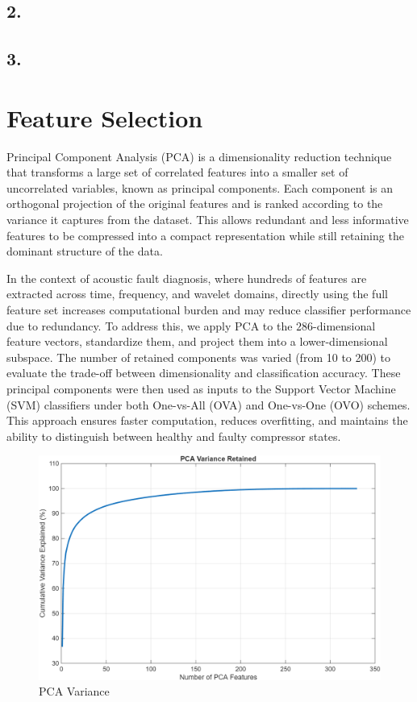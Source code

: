 \documentclass[12pt,a4paper]{article}
\begin{document}
\begin{multicols}{2}
\subsection{2.}
\subsection{3.}
\section{Feature Selection}
Principal Component Analysis (PCA) is a dimensionality reduction technique that
transforms a large set of correlated features into a smaller set of uncorrelated
variables, known as principal components. Each component is an orthogonal
projection of the original features and is ranked according to the variance it
captures from the dataset. This allows redundant and less informative features
to be compressed into a compact representation while still retaining the
dominant structure of the data.

In the context of acoustic fault diagnosis, where hundreds of features are
extracted across time, frequency, and wavelet domains, directly using the full
feature set increases computational burden and may reduce classifier performance
due to redundancy. To address this, we apply PCA to the $286$-dimensional feature
vectors, standardize them, and project them into a lower-dimensional subspace.
The number of retained components was varied (from 10 to 200) to evaluate the
trade-off between dimensionality and classification accuracy. These principal
components were then used as inputs to the Support Vector Machine (SVM)
classifiers under both One-vs-All (OVA) and One-vs-One (OVO) schemes. This
approach ensures faster computation, reduces overfitting, and maintains the
ability to distinguish between healthy and faulty compressor states.
\begin{figure}[H]
    \centering
    \includegraphics[width=0.85\linewidth]{pcavar.png}
    \caption{PCA Variance}
    \label{fig:placeholder}
\end{figure}

\end{multicols}
\end{document}

